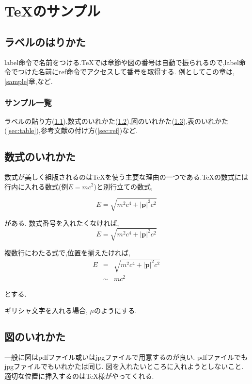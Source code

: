 \chapter{\TeX のサンプル} \label{sec:sample}

\section{ラベルのはりかた}\label{sec:label}
label命令で名前をつける.\TeX では章節や図の番号は自動で振られるので,label命令でつけた名前にref命令でアクセスして番号を取得する.
例としてこの章は,\ref{sample}章,など.

\subsection{サンプル一覧}\label{sec:list}
ラベルの貼り方(\ref{sec:label}),数式のいれかた(\ref{sec:eq}),図のいれかた(\ref{sec:figure}),表のいれかた(\ref{sec:table}),参考文献の付け方(\ref{sec:ref})など.

\section{数式のいれかた}\label{sec:eq}
数式が美しく組版されるのは\TeX を使う主要な理由の一つである.\TeX の数式には行内に入れる数式(例$E=mc^2$)と別行立ての数式,

\begin{equation}
	E = \sqrt{m^2 c^4 +|\bm{p}|^2 c^2}
\end{equation}

がある.
数式番号を入れたくなければ,
\begin{equation}
	\nonumber
	E = \sqrt{m^2 c^4 +|\bm{p}|^2 c^2}
\end{equation}

複数行にわたる式で,位置を揃えたければ,
\begin{eqnarray}
	\nonumber
	E & =    & \sqrt{m^2 c^4 +|\bm{p}|^2 c^2} \\
	  & \sim & mc^2
\end{eqnarray}

とする.

ギリシャ文字を入れる場合, $\mu$のようにする.

\section{図のいれかた}\label{sec:figure}

一般に図はpdfファイル或いはjpgファイルで用意するのが良い.
pdfファイルでもjpgファイルでもいれかたは同じ.
図を入れたいところに入れようとしないこと.
適切な位置に挿入するのは\TeX 様がやってくれる.



